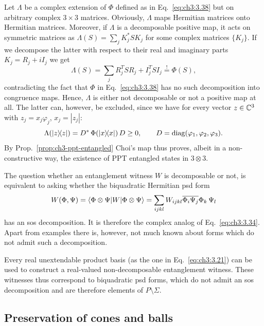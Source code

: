 \documentclass[11pt,a4paper]{article}
\numberwithin{equation}{section}
\begin{document}
Let $\Lambda$ be a complex extension of $\Phi$ defined as in Eq.~\eqref{eq:ch3:3.38} but on arbitrary complex
$3\times 3$ matrices. Obviously, $\Lambda$ maps Hermitian matrices onto Hermitian matrices. Moreover, if $\Lambda$ is a
decomposable positive map, it acts on symmetric matrices as $\Lambda(S)=\sum_j K_j^*SK_j$ for some complex matrices
$\{K_j\}$. If we decompose the latter with respect to their real and imaginary parts $K_j=R_j+iI_j$ we get
\begin{equation}\label{eq:ch3:3.39}
    \Lambda(S)=\sum_j R_j^T SR_j + I_j^T SI_j \overset{!}{=} \Phi(S),
\end{equation}
contradicting the fact that $\Phi$ in Eq.~\eqref{eq:ch3:3.38} has no such decomposition into congruence maps. Hence,
$\Lambda$ is either not decomposable or not a positive map at all. The latter can, however, be excluded, since we have
for every vector $z\in \mathbb{C}^3$ with $z_j=x_j\varphi_j$, $x_j=|z_j|$:
\begin{equation}\label{eq:ch3:3.40}
    \Lambda(|z\rangle\!\langle z|)= D^*\,\Phi(|x\rangle\!\langle x|)\,D \ge 0,
    \qquad D=\operatorname{diag}(\varphi_1,\varphi_2,\varphi_3).
\end{equation}
By Prop.~\ref{prop:ch3-ppt-entangled} Choi's map thus proves, albeit in a non-constructive way, the existence of PPT
entangled states in $3\otimes 3$.

The question whether an entanglement witness $W$ is decomposable or not, is equivalent to asking whether the
biquadratic Hermitian psd form
\begin{equation}\label{eq:ch3:3.41}
    W(\Phi,\Psi)=\langle\Phi\otimes \Psi|W|\Phi\otimes \Psi\rangle
    =\sum_{ijkl} W_{ijkl} \overline{\Phi_i} \overline{\Psi_j} \Phi_k\,\Psi_l
\end{equation}
has an sos decomposition. It is therefore the complex analog of Eq.~\eqref{eq:ch3:3.34}. Apart from examples there is,
however, not much known about forms which do not admit such a decomposition.

Every real unextendable product basis (as the one in Eq.~\eqref{eq:ch3:3.21}) can be used to construct a real-valued
non-decomposable entanglement witness. These witnesses thus correspond to biquadratic psd forms, which do not admit an
sos decomposition and are therefore elements of $P\setminus \Sigma$.

\subsection{Preservation of cones and balls}
\end{document}
